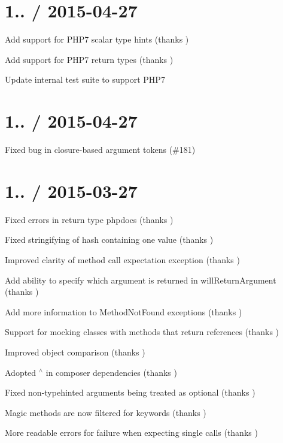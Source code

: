 \section*{1.. / 2015-\/04-\/27 }


\begin{DoxyItemize}
\item Add support for P\+H\+P7 scalar type hints (thanks )
\item Add support for P\+H\+P7 return types (thanks )
\item Update internal test suite to support P\+H\+P7
\end{DoxyItemize}

\section*{1.. / 2015-\/04-\/27 }


\begin{DoxyItemize}
\item Fixed bug in closure-\/based argument tokens (\#181)
\end{DoxyItemize}

\section*{1.. / 2015-\/03-\/27 }


\begin{DoxyItemize}
\item Fixed errors in return type phpdocs (thanks )
\item Fixed stringifying of hash containing one value (thanks )
\item Improved clarity of method call expectation exception (thanks )
\item Add ability to specify which argument is returned in will\+Return\+Argument (thanks )
\item Add more information to Method\+Not\+Found exceptions (thanks )
\item Support for mocking classes with methods that return references (thanks )
\item Improved object comparison (thanks )
\item Adopted \textquotesingle{}$^\wedge$\textquotesingle{} in composer dependencies (thanks )
\item Fixed non-\/typehinted arguments being treated as optional (thanks )
\item Magic methods are now filtered for keywords (thanks )
\item More readable errors for failure when expecting single calls (thanks )
\end{DoxyItemize}

